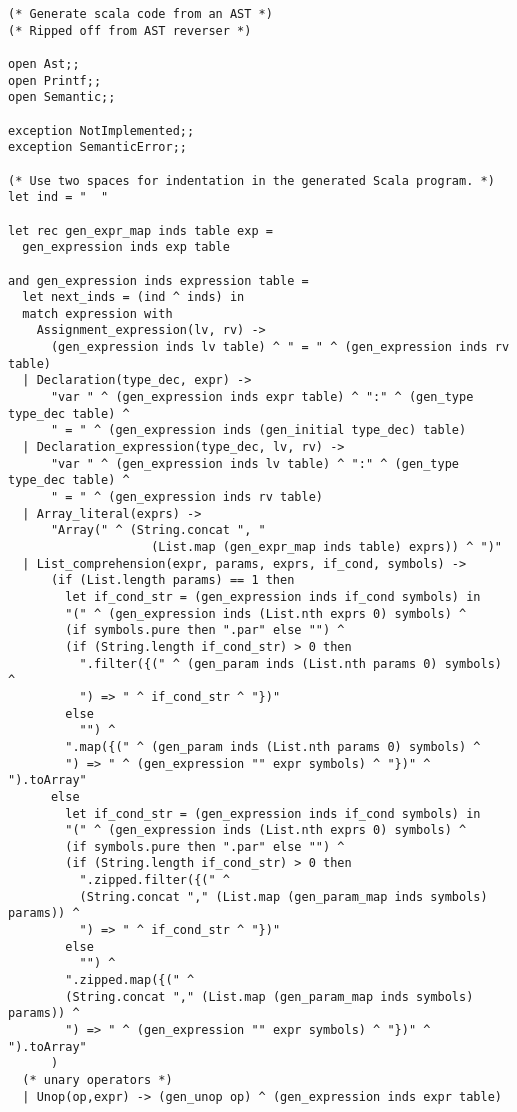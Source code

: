 \begin{verbatim}
(* Generate scala code from an AST *)
(* Ripped off from AST reverser *)

open Ast;;
open Printf;;
open Semantic;;

exception NotImplemented;;
exception SemanticError;;

(* Use two spaces for indentation in the generated Scala program. *)
let ind = "  "

let rec gen_expr_map inds table exp =
  gen_expression inds exp table

and gen_expression inds expression table =
  let next_inds = (ind ^ inds) in
  match expression with
    Assignment_expression(lv, rv) ->
      (gen_expression inds lv table) ^ " = " ^ (gen_expression inds rv table)
  | Declaration(type_dec, expr) ->
      "var " ^ (gen_expression inds expr table) ^ ":" ^ (gen_type type_dec table) ^
      " = " ^ (gen_expression inds (gen_initial type_dec) table)
  | Declaration_expression(type_dec, lv, rv) ->
      "var " ^ (gen_expression inds lv table) ^ ":" ^ (gen_type type_dec table) ^
      " = " ^ (gen_expression inds rv table)
  | Array_literal(exprs) ->
      "Array(" ^ (String.concat ", "
                    (List.map (gen_expr_map inds table) exprs)) ^ ")"
  | List_comprehension(expr, params, exprs, if_cond, symbols) ->
      (if (List.length params) == 1 then
        let if_cond_str = (gen_expression inds if_cond symbols) in
        "(" ^ (gen_expression inds (List.nth exprs 0) symbols) ^
        (if symbols.pure then ".par" else "") ^
        (if (String.length if_cond_str) > 0 then
          ".filter({(" ^ (gen_param inds (List.nth params 0) symbols) ^
          ") => " ^ if_cond_str ^ "})"
        else
          "") ^
        ".map({(" ^ (gen_param inds (List.nth params 0) symbols) ^ 
        ") => " ^ (gen_expression "" expr symbols) ^ "})" ^ ").toArray"
      else
        let if_cond_str = (gen_expression inds if_cond symbols) in
        "(" ^ (gen_expression inds (List.nth exprs 0) symbols) ^
        (if symbols.pure then ".par" else "") ^
        (if (String.length if_cond_str) > 0 then
          ".zipped.filter({(" ^
          (String.concat "," (List.map (gen_param_map inds symbols) params)) ^
          ") => " ^ if_cond_str ^ "})"
        else
          "") ^
        ".zipped.map({(" ^
        (String.concat "," (List.map (gen_param_map inds symbols) params)) ^ 
        ") => " ^ (gen_expression "" expr symbols) ^ "})" ^ ").toArray"
      )
  (* unary operators *)
  | Unop(op,expr) -> (gen_unop op) ^ (gen_expression inds expr table)

\end{verbatim}
